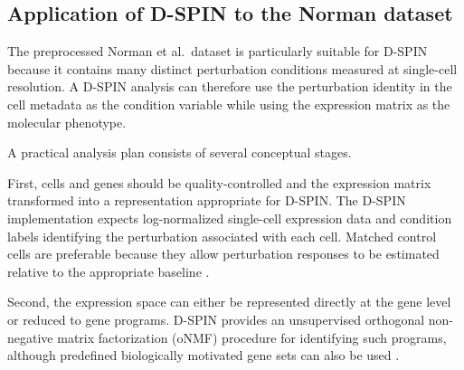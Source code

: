 \documentclass[11pt,a4paper]{article}
\begin{document}
%

\subsection{Application of D-SPIN to the Norman dataset}

The preprocessed Norman et al.\ dataset is particularly suitable for D-SPIN
because it contains many distinct perturbation conditions measured at
single-cell resolution. A D-SPIN analysis can therefore use the perturbation
identity in the cell metadata as the condition variable while using the
expression matrix as the molecular phenotype.

A practical analysis plan consists of several conceptual stages. 

First, cells and genes should be quality-controlled and the expression matrix transformed into
a representation appropriate for D-SPIN. The D-SPIN implementation expects
log-normalized single-cell expression data and condition labels identifying
the perturbation associated with each cell. Matched control cells are
preferable because they allow perturbation responses to be estimated relative
to the appropriate baseline \cite{jiang2025guide}.

Second, the expression space can either be represented directly at the
gene level or reduced to gene programs. D-SPIN provides an unsupervised
orthogonal non-negative matrix factorization (oNMF) procedure for identifying
such programs, although predefined biologically motivated gene sets can also
be used \cite{jiang2023dspin}.
\end{document}
